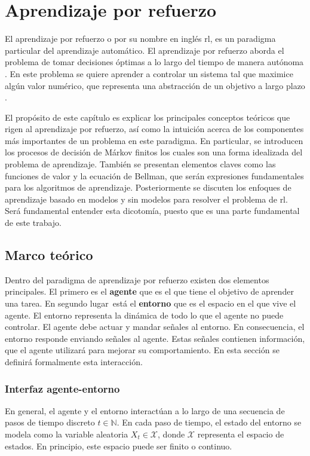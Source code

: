 \chapter{Aprendizaje por refuerzo}
\label{chapter:rl}

El aprendizaje por refuerzo o por su nombre en inglés \acrfull{rl}, es un paradigma particular del aprendizaje automático. El aprendizaje por refuerzo aborda el problema de tomar decisiones óptimas a lo largo del tiempo de manera autónoma \cite{lapan2018deep}. En este problema se quiere aprender a controlar un sistema tal que maximice algún valor numérico, que representa una abstracción de un objetivo a largo plazo \cite{Szepesvari2010}.

El propósito de este capítulo es explicar los principales conceptos teóricos que rigen al aprendizaje por refuerzo, así como la intuición acerca de los componentes más importantes de un problema en este paradigma. En particular, se introducen los procesos de decisión de Márkov finitos los cuales son una forma idealizada del problema de aprendizaje. También se presentan elementos claves como las funciones de valor y la ecuación de Bellman, que serán expresiones fundamentales para los algoritmos de aprendizaje. Posteriormente se discuten los enfoques de aprendizaje basado en modelos y sin modelos para resolver el problema de \acrshort{rl}. Será fundamental entender esta dicotomía, puesto que es una parte fundamental de este trabajo.

\section{Marco teórico} 
\label{sec:marco_teorico}
Dentro del paradigma de aprendizaje por refuerzo existen dos elementos principales. El primero es el \textbf{agente} que es el que tiene el objetivo de aprender una tarea. En segundo lugar está el \textbf{entorno} que es el espacio en el que vive el agente. El entorno representa la dinámica de todo lo que el agente no puede controlar. El agente debe actuar y mandar señales al entorno. En consecuencia, el entorno responde enviando señales al agente. Estas señales contienen información, que el agente utilizará para mejorar su comportamiento. En esta sección se definirá formalmente esta interacción. 

\subsection{Interfaz agente-entorno}
En general, el agente y el entorno interactúan a lo largo de una secuencia de pasos de tiempo discreto $t \in \mathbb{N}$. En cada paso de tiempo, el estado del entorno se modela como la variable aleatoria $X_t \in \mathcal{X}$, donde $\mathcal{X}$ representa el espacio de estados. En principio, este espacio puede ser finito o continuo.

